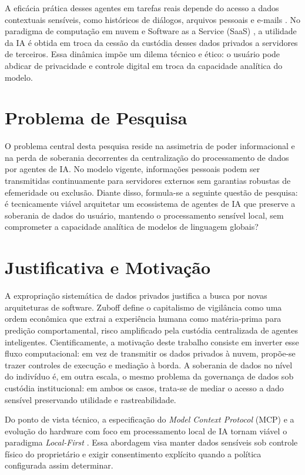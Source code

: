 \documentclass[12pt,openright,twoside,a4paper,english,brazil]{abntex2}
\begin{document}
A eficácia prática desses agentes em tarefas reais depende do acesso a dados contextuais sensíveis, como históricos de diálogos, arquivos pessoais e e-mails \cite{liu2024}. No paradigma de computação em nuvem e Software as a Service (SaaS) \cite{wu2011}, a utilidade da IA é obtida em troca da cessão da custódia desses dados privados a servidores de terceiros. Essa dinâmica impõe um dilema técnico e ético: o usuário pode abdicar de privacidade e controle digital em troca da capacidade analítica do modelo.

\section{Problema de Pesquisa}
O problema central desta pesquisa reside na assimetria de poder informacional e na perda de soberania decorrentes da centralização do processamento de dados por agentes de IA. No modelo vigente, informações pessoais podem ser transmitidas continuamente para servidores externos sem garantias robustas de efemeridade ou exclusão. Diante disso, formula-se a seguinte questão de pesquisa: é tecnicamente viável arquitetar um ecossistema de agentes de IA que preserve a soberania de dados do usuário, mantendo o processamento sensível local, sem comprometer a capacidade analítica de modelos de linguagem globais?

\section{Justificativa e Motivação}
A expropriação sistemática de dados privados justifica a busca por novas arquiteturas de software. Zuboff \cite{zuboff2019} define o capitalismo de vigilância como uma ordem econômica que extrai a experiência humana como matéria-prima para predição comportamental, risco amplificado pela custódia centralizada de agentes inteligentes. Cientificamente, a motivação deste trabalho consiste em inverter esse fluxo computacional: em vez de transmitir os dados privados à nuvem, propõe-se trazer controles de execução e mediação à borda. A soberania de dados no nível do indivíduo é, em outra escala, o mesmo problema da governança de dados sob custódia institucional: em ambos os casos, trata-se de mediar o acesso a dado sensível preservando utilidade e rastreabilidade.

Do ponto de vista técnico, a especificação do \textit{Model Context Protocol} (MCP) \cite{anthropic2024} e a evolução do hardware com foco em processamento local de IA tornam viável o paradigma \textit{Local-First} \cite{kleppmann2019}. Essa abordagem visa manter dados sensíveis sob controle físico do proprietário e exigir consentimento explícito quando a política configurada assim determinar.
\end{document}
